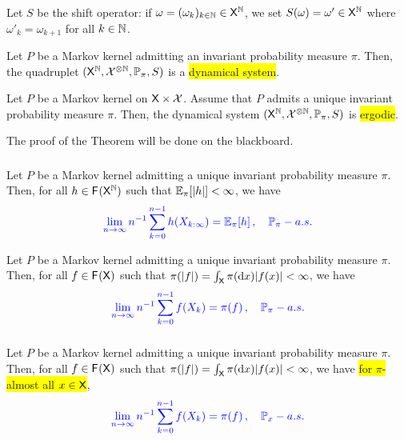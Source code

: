 \documentclass[usenames,dvipsnames]{beamer}
\newcommand\mycoltwo[1]{{\color{blue}#1}}
\newcommand\mycolthree[1]{{\color{Emerald}#1}}
\newcommand\colbox[1]{\colorbox{Yellow}{#1}}
\begin{document}
\begin{frame}
  \frametitle{}
  Let $S$ be the shift operator: if $\omega=(\omega_k)_{k\in\mathbb{N}} \in \mathsf{X}^{\mathbb{N}}$, we set $S(\omega)=\omega' \in \mathsf{X}^{\mathbb{N}}$ where $\omega'_k=\omega_{k+1}$ for all $k\in\mathbb{N}$.  
  \begin{lemma}
    Let $P$ be a Markov kernel admitting an \alert{invariant probability measure}
    $\pi$. Then, the quadruplet $(\mathsf{X}^{\mathbb{N}},\mathcal{X}^{\otimes\mathbb{N}},\mathbb{P}_{\pi},S)$
    is a \colbox{dynamical system}.
    \end{lemma}
    \pause
    \begin{theorem}
      Let $P$ be a Markov kernel on $\mathsf{X}\times\mathcal{X}$. Assume that
      $P$ admits a \alert{unique invariant probability measure} $\pi$. Then, the
      dynamical system $(\mathsf{X}^{\mathbb{N}},\mathcal{X}^{\otimes\mathbb{N}},\mathbb{P}_{\pi},S)$
      is \colbox{ergodic}.
      \end{theorem}
      \pause 
      \mycolthree{The proof of the Theorem will be done on the blackboard. }
\end{frame}  

\begin{frame}
  \frametitle{}
  \begin{theorem}
    Let $P$ be a Markov kernel admitting a
\alert{unique invariant probability measure} $\pi.$ Then, for all $h\in\mathsf{F_{}}(\mathsf{X}^{\mathbb{N}})$
such that $\mathbb{E}_{\pi}[|h|]<\infty$, we have
\[
\mycoltwo{\lim_{n\to\infty}n^{-1}\sum_{k=0}^{n-1}h(X_{k:\infty})=\PE_{\pi}[h]\,,\quad\PP_{\pi}-a.s.}
\]
  \end{theorem}
\pause
  \begin{corollary}
  Let $P$ be a Markov kernel admitting a
  \alert{unique invariant probability measure} $\pi.$ Then, for all $f\in\mathsf{F_{}}(\mathsf{X})$
  such that $\pi(|f|)=\int_{\mathsf{X}}\pi(\mathrm{d} x)|f(x)|<\infty$, we have
  \begin{equation}
  \mycoltwo{\lim_{n\to\infty}n^{-1}\sum_{k=0}^{n-1}f(X_{k})=\pi(f)\,,\quad\PP_{\pi}-a.s.\label{eq:markov:LLN}}
  \end{equation}
  \end{corollary}
 
  
 
\end{frame}

\begin{frame}
  \frametitle{}
  \begin{corollary}
    Let $P$ be a Markov kernel admitting
    a \alert{unique invariant probability measure} $\pi.$ Then, for all $f\in\mathsf{F_{}}(\mathsf{X})$
    such that $\pi(|f|)=\int_{\mathsf{X}}\pi(\mathrm{d} x)|f(x)|<\infty$, we have
    \colbox{for $\pi$-almost all $x\in\mathsf{X}$},
    \begin{equation}
    \mycoltwo{\lim_{n\to\infty}n^{-1}\sum_{k=0}^{n-1}f(X_{k})=\pi(f)\,,\quad\PP_{x}-a.s.\label{eq:lln:almost}}
    \end{equation}
    \end{corollary}
  \end{frame}
\end{document}
